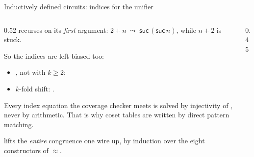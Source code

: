 \begin{frame}{Inductively defined circuits: indices for the unifier \InPaper}
\begin{columns}[c]
\begin{column}{0.52\textwidth}
\aid{\_+\_} recurses on its \emph{first} argument:
$2 + n \;\leadsto\; \mathsf{suc}\,(\mathsf{suc}\,n)$, while $n + 2$ is stuck.

\vspace{4pt}
So the indices are \alert{left-biased} too:
\begin{itemize}
  \item {}, not  with $k\ge 2$;
  \item $k$-fold shift: .
\end{itemize}
Every index equation the coverage checker meets is solved by
\alert{injectivity of }, never by arithmetic. That is why coset tables
are written by direct pattern matching.

\vspace{4pt}
\small {} lifts the \emph{entire} congruence one wire up, by
induction over the eight constructors of $\approx$.
\end{column}
\begin{column}{0.45\textwidth}
\centering
{}
\end{column}
\end{columns}
\end{frame}

